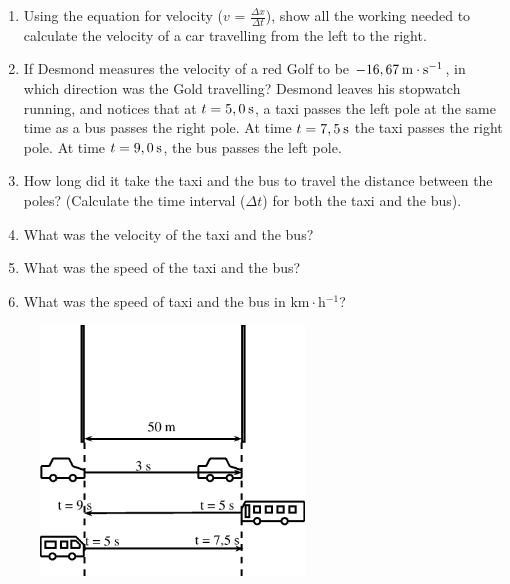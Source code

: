 \begin{enumerate}[noitemsep, label=\textbf{\arabic*}. ]
\label{m38791*id66815}\begin{enumerate}[noitemsep, label=\textbf{\alph*}. ] 
            \label{m38791*uid45}\item Using the equation for velocity ($v$ = $\frac{\Delta x}{\Delta t}$), show all the working needed to calculate the velocity of a car travelling from the left to the right.
\label{m38791*uid46}\item If Desmond measures the velocity of a red Golf to be $-16,67\phantom{\rule{2pt}{0ex}}\mathrm{m}\ensuremath{\cdot}\mathrm{s}{}^{-1}$, in which direction was the Gold travelling?
Desmond leaves his stopwatch running, and notices that at $t=5,0\phantom{\rule{2pt}{0ex}}\mathrm{s}$, a taxi passes the left pole at the same time as a bus passes the right pole. At time $t=7,5\phantom{\rule{2pt}{0ex}}\mathrm{s}$ the taxi passes the right pole. At time $t=9,0\phantom{\rule{2pt}{0ex}}\mathrm{s}$, the bus passes the left pole.
\label{m38791*uid47}\item How long did it take the taxi and the bus to travel the distance between the poles?
(Calculate the time interval ($\Delta t$) for both the taxi and the bus).
\label{m38791*uid48}\item What was the velocity of the taxi and the bus?
\label{m38791*uid49}\item What was the speed of the taxi and the bus?
\label{m38791*uid50}\item What was the speed of taxi and the bus in $\mathrm{km}\ensuremath{\cdot}\mathrm{h}{}^{-1}$?
\end{enumerate}
    \setcounter{subfigure}{0}
	\begin{figure}[H] %
    \begin{center}
    \label{m38791*id66998!!!underscore!!!media}\label{m38791*id66998!!!underscore!!!printimage}\includegraphics[width=7cm]{col11305.imgs/m38791_PG10C2_018.png} %

\end{center}
\end{figure}
\end{enumerate}
